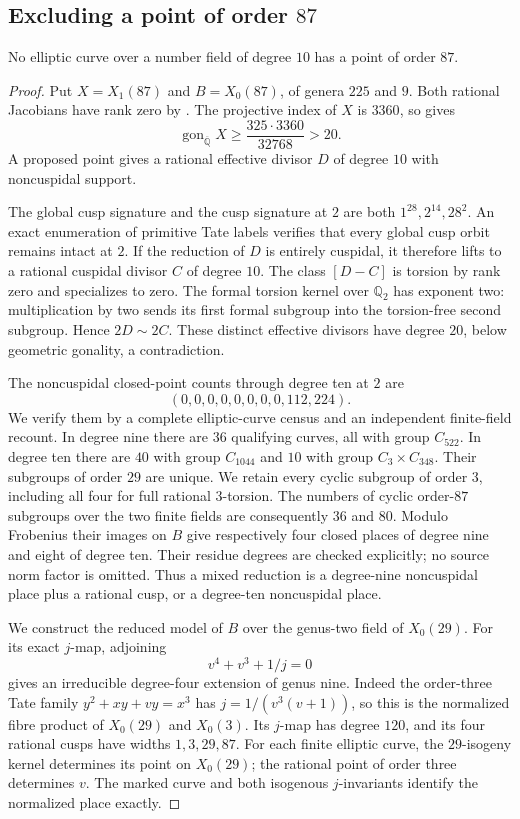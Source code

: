 \subsection{Excluding a point of order $87$}
\begin{proposition}\label{prop:decic-no87}
No elliptic curve over a number field of degree $10$ has a point of order $87$.
\end{proposition}
\begin{proof}
Put $X=X_1(87)$ and $B=X_0(87)$, of genera $225$ and $9$.
Both rational Jacobians have rank zero by
\cite[Theorem~3.1]{DEHMZ}. The projective index of $X$ is $3360$, so
\cite[(2.1)]{NV} gives
\[
 \operatorname{gon}_{\overline{\mathbb Q}}X
 \geq \frac{325\cdot3360}{32768}>20.
\]
A proposed point gives a rational effective divisor $D$ of degree $10$
with noncuspidal support.

The global cusp signature and the cusp signature at $2$ are both
$1^{28},2^{14},28^2$. An exact enumeration of primitive Tate labels
verifies that every global cusp orbit remains intact at $2$.
If the reduction of $D$ is entirely cuspidal, it therefore lifts to
a rational cuspidal divisor $C$ of degree $10$.
The class $[D-C]$ is torsion by rank zero and specializes to zero.
The formal torsion kernel over $\mathbb Q_2$ has exponent two:
multiplication by two sends its first formal subgroup into the
torsion-free second subgroup. Hence $2D\sim2C$.
These distinct effective divisors have degree $20$, below geometric
gonality, a contradiction.

The noncuspidal closed-point counts through degree ten at $2$ are
\[
 (0,0,0,0,0,0,0,0,112,224).
\]
We verify them by a complete elliptic-curve census and an independent
finite-field recount. In degree nine there are $36$ qualifying curves,
all with group $C_{522}$. In degree ten there are $40$ with group
$C_{1044}$ and $10$ with group $C_3\times C_{348}$.
Their subgroups of order $29$ are unique. We retain every cyclic
subgroup of order $3$, including all four for full rational $3$-torsion.
The numbers of cyclic order-$87$ subgroups over the two finite fields
are consequently $36$ and $80$.
Modulo Frobenius their images on $B$ give respectively four closed
places of degree nine and eight of degree ten. Their residue degrees
are checked explicitly; no source norm factor is omitted.
Thus a mixed reduction is a degree-nine noncuspidal place plus a
rational cusp, or a degree-ten noncuspidal place.

We construct the reduced model of $B$ over the genus-two field of
$X_0(29)$. For its exact $j$-map, adjoining
\[
 v^4+v^3+1/j=0
\]
gives an irreducible degree-four extension of genus nine.
Indeed the order-three Tate family
$y^2+xy+vy=x^3$ has $j=1/(v^3(v+1))$, so this is the normalized
fibre product of $X_0(29)$ and $X_0(3)$.
Its $j$-map has degree $120$, and its four rational cusps have widths
$1,3,29,87$.
For each finite elliptic curve, the $29$-isogeny kernel determines its
point on $X_0(29)$; the rational point of order three determines $v$.
The marked curve and both isogenous $j$-invariants identify the
normalized place exactly.


\end{proof}
